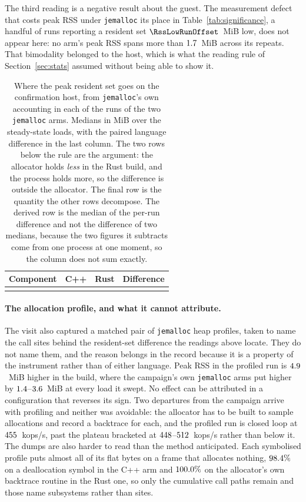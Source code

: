 \documentclass[english,oneside,a4paper,censored,csm,software-track-2020]{HYthesisML}
\begin{document}
The third reading is a negative result about the guest. The measurement defect that costs peak RSS
under \texttt{jemalloc} its place in Table~\ref{tab:significance}, a handful of runs reporting a
resident set $\RssLowRunOffset$~MiB low, does not appear here: no arm's peak RSS spans more than
$1.7$~MiB across its repeats. That bimodality belonged to the host, which is what the
reading rule of Section~\ref{sec:stats} assumed without being able to show it.

\begin{table}[ht]
\centering
\small
\caption[The resident set decomposed on the confirmation host]{Where the peak resident set goes on
the confirmation host, from \texttt{jemalloc}'s own accounting in each of the \BmJeRuns{} runs of
the two \texttt{jemalloc} arms. Medians in MiB over the steady-state loads, with the paired language
difference in the last column. The two rows below the rule are the argument: the allocator holds
\emph{less} in the Rust build, and the process holds more, so the difference is outside the
allocator. The final row is the quantity the other rows decompose. The derived row is the median of
the per-run difference and not the difference of two medians, because the two figures it subtracts
come from one process at one moment, so the column does not sum
exactly.\label{tab:resident}}
\begin{tabular}{@{}l r r r@{}}
\hline\hline
Component & C++ & Rust & Difference \\
\hline
\\
\hline
\end{tabular}
\end{table}

\paragraph{The allocation profile, and what it cannot attribute.}
The visit also captured a matched pair of \texttt{jemalloc} heap profiles, taken to name the call
sites behind the resident-set difference the readings above locate. They do not name them, and the
reason belongs in the record because it is a property of the instrument rather than of either
language. Peak RSS in the profiled run is $4.9$~MiB higher in the \BmProfRssHigher{}
build, where the campaign's own \texttt{jemalloc} arms put \BmProfCampaignHigher{} higher by
$1.4$--$3.6$~MiB at every load it swept. No effect can be attributed in
a configuration that reverses its sign. Two departures from the campaign arrive with profiling and
neither was avoidable: the allocator has to be built to sample allocations and record a backtrace
for each, and the profiled run is closed loop at $455$~kops/s, past the plateau
bracketed at $448$--$512$~kops/s rather than below it. The dumps are also harder to read
than the method anticipated. Each symbolised profile puts almost all of its flat bytes on a frame
that allocates nothing, $98.4\%$ on a deallocation symbol in the C++ arm and
$100.0\%$ on the allocator's own backtrace routine in the Rust one, so only the
cumulative call paths remain and those name subsystems rather than sites.
\end{document}
